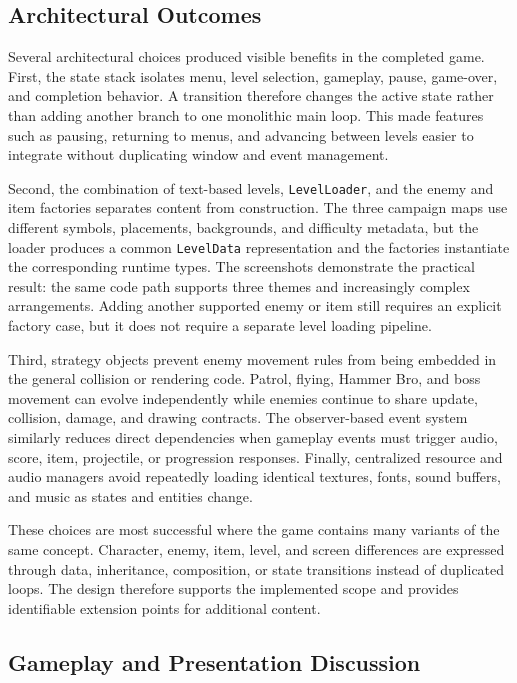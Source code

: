 \documentclass{template}
\begin{document}
\subsection{Architectural Outcomes}

Several architectural choices produced visible benefits in the completed
game. First, the state stack isolates menu, level selection, gameplay, pause,
game-over, and completion behavior. A transition therefore changes the active
state rather than adding another branch to one monolithic main loop. This made
features such as pausing, returning to menus, and advancing between levels
easier to integrate without duplicating window and event management.

Second, the combination of text-based levels, \texttt{LevelLoader}, and the
enemy and item factories separates content from construction. The three
campaign maps use different symbols, placements, backgrounds, and difficulty
metadata, but the loader produces a common \texttt{LevelData} representation
and the factories instantiate the corresponding runtime types. The screenshots
demonstrate the practical result: the same code path supports three themes and
increasingly complex arrangements. Adding another supported enemy or item still
requires an explicit factory case, but it does not require a separate level
loading pipeline.

Third, strategy objects prevent enemy movement rules from being embedded in
the general collision or rendering code. Patrol, flying, Hammer Bro, and boss
movement can evolve independently while enemies continue to share update,
collision, damage, and drawing contracts. The observer-based event system
similarly reduces direct dependencies when gameplay events must trigger audio,
score, item, projectile, or progression responses. Finally, centralized
resource and audio managers avoid repeatedly loading identical textures, fonts,
sound buffers, and music as states and entities change.

These choices are most successful where the game contains many variants of the
same concept. Character, enemy, item, level, and screen differences are
expressed through data, inheritance, composition, or state transitions instead
of duplicated loops. The design therefore supports the implemented scope and
provides identifiable extension points for additional content.

\subsection{Gameplay and Presentation Discussion}
\end{document}
